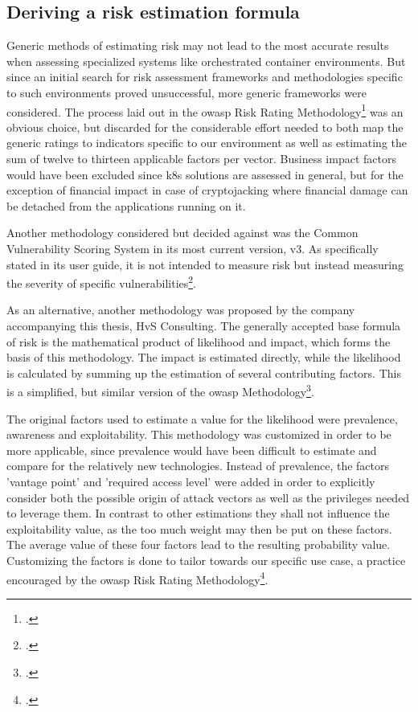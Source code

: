 \subsection{Deriving a risk estimation formula}
Generic methods of estimating risk may not lead to the most accurate results when assessing specialized systems like orchestrated container environments.
But since an initial search for risk assessment frameworks and methodologies specific to such environments proved unsuccessful, more generic frameworks were considered. 
The process laid out in the \gls{owasp} Risk Rating Methodology\footcite[][, sections 'Step 2' to 'Step 4' ]{riskRating} was an obvious choice, but discarded for the considerable effort needed to both map the generic ratings to indicators specific to our environment as well as estimating the sum of twelve to thirteen applicable factors per vector. Business impact factors would have been excluded since \gls{k8s} solutions are assessed in general, but for the exception of financial impact in case of cryptojacking where financial damage can be detached from the applications running on it.

Another methodology considered but decided against was the Common Vulnerability Scoring System in its most current version, v3. As specifically stated in its user guide, it is not intended to measure risk but instead measuring the severity of specific vulnerabilities\footcite[][, section '2.1. CVSS Measures Severity, not Risk']{cvssUserGuide}.

As an alternative, another methodology was proposed by the company accompanying this thesis, HvS Consulting. The generally accepted base formula of risk is the mathematical product of likelihood and impact, which forms the basis of this methodology. The impact is estimated directly, while the likelihood is calculated by summing up the estimation of several contributing factors. This is a simplified, but similar version of the \gls{owasp} Methodology\footcite[][, section 'Step 4: Determining the Severity of the Risk']{riskRating}. 

The original factors used to estimate a value for the likelihood were prevalence, awareness and exploitability. This methodology was customized in order to be more applicable, since prevalence would have been difficult to estimate and compare for the relatively new technologies. Instead of prevalence, the factors 'vantage point' and 'required access level' were added in order to explicitly consider both the possible origin of attack vectors as well as the privileges needed to leverage them. In contrast to other estimations they shall not influence the exploitability value, as the too much weight may then be put on these factors. The average value of these four factors lead to the resulting probability value. Customizing the factors is done to tailor towards our specific use case, a practice encouraged by the \gls{owasp} Risk Rating Methodology\footcite[][, section 'Step 6: Customizing the Risk Rating Model']{riskRating}.

